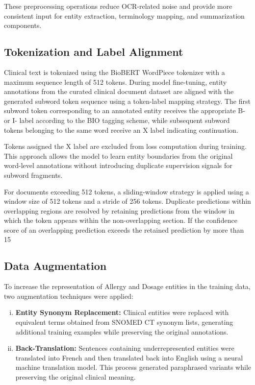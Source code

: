 These preprocessing operations reduce OCR-related noise and provide more consistent input for entity extraction, terminology mapping, and summarization components.

\subsection{Tokenization and Label Alignment}

Clinical text is tokenized using the BioBERT WordPiece tokenizer with a maximum sequence length of 512 tokens. During model fine-tuning, entity annotations from the curated clinical document dataset are aligned with the generated subword token sequence using a token-label mapping strategy. The first subword token corresponding to an annotated entity receives the appropriate B- or I- label according to the BIO tagging scheme, while subsequent subword tokens belonging to the same word receive an X label indicating continuation.

Tokens assigned the X label are excluded from loss computation during training. This approach allows the model to learn entity boundaries from the original word-level annotations without introducing duplicate supervision signals for subword fragments.

For documents exceeding 512 tokens, a sliding-window strategy is applied using a window size of 512 tokens and a stride of 256 tokens. Duplicate predictions within overlapping regions are resolved by retaining predictions from the window in which the token appears within the non-overlapping section. If the confidence score of an overlapping prediction exceeds the retained prediction by more than 15%

\subsection{Data Augmentation}

To increase the representation of Allergy and Dosage entities in the training data, two augmentation techniques were applied:

\begin{enumerate}[(i)]

\item \textbf{Entity Synonym Replacement:} Clinical entities were replaced with equivalent terms obtained from SNOMED CT synonym lists, generating additional training examples while preserving the original annotations.

\item \textbf{Back-Translation:} Sentences containing underrepresented entities were translated into French and then translated back into English using a neural machine translation model. This process generated paraphrased variants while preserving the original clinical meaning.

\end{enumerate}

